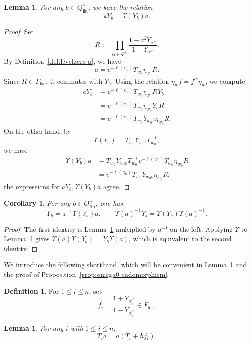 \documentclass{amsart}
\newtheorem{Lem}[Thm]{Lemma}
\newtheorem{Cor}[Thm]{Corollary}
\theoremstyle{definition}
\newtheorem{defi}[Thm]{Definition}
\numberwithin{equation}{section}
\begin{document}
\begin{Lem}\label{lem:a-y-relation}
For any $b \in Q_{\mathrm{fin}}^\vee$, we have the relation
\[
a Y_b  = \Upsilon(Y_b) a.
\]
\end{Lem}
\begin{proof}
Set
\[
R:=\prod_{\alpha\in\Phi^+}\frac{1-v^2Y_{\alpha^\vee}}{1-Y_{\alpha^\vee}}.
\]
By Definition~\ref{def:levelzero-a}, we have
\[
a=v^{-\ell(w_0)}T_{w_0}\eta_{w_0}R.
\]
Since \(R\in F_{\mathrm{loc}}\), it commutes with \(Y_b\). Using the relation \(\eta_w f=f^w\eta_w\), we compute
\begin{align*}
a Y_b
&=v^{-\ell(w_0)}T_{w_0}\eta_{w_0}RY_b\\
&=v^{-\ell(w_0)}T_{w_0}\eta_{w_0}Y_bR\\
&=v^{-\ell(w_0)}T_{w_0}Y_{w_0b}\eta_{w_0}R.
\end{align*}
On the other hand, by
\[
\Upsilon(Y_b)=T_{w_0}Y_{w_0b}T_{w_0}^{-1},
\]
we have
\begin{align*}
\Upsilon(Y_b)a
&=T_{w_0}Y_{w_0b}T_{w_0}^{-1}
  v^{-\ell(w_0)}T_{w_0}\eta_{w_0}R\\
&=v^{-\ell(w_0)}T_{w_0}Y_{w_0b}\eta_{w_0}R;
\end{align*}
the expressions for $aY_b, \Upsilon(Y_b)a$ agree.
\end{proof}

\begin{Cor}\label{cor:a-y-inverse-relations}
For any \(b\in Q_{\mathrm{fin}}^\vee\), one has
\[
Y_b=a^{-1}\Upsilon(Y_b)a,
\qquad
\Upsilon(a)^{-1}Y_b=\Upsilon(Y_b)\Upsilon(a)^{-1}.
\]
\end{Cor}
\begin{proof}
The first identity is Lemma~\ref{lem:a-y-relation} multiplied by \(a^{-1}\)
on the left. Applying \(\Upsilon\) to Lemma~\ref{lem:a-y-relation} gives
\(\Upsilon(a)\Upsilon(Y_b)=Y_b\Upsilon(a)\), which is equivalent to the
second identity.
\end{proof}

We introduce the following shorthand, which will be convenient in
Lemma~\ref{lem:t-a-relation} and the proof of
Proposition~\ref{prop:omega0-endomorphism}.
\begin{defi}
For $1\leqslant i\leqslant n$, set
\[
f_i=\frac{1+Y_{\alpha_i^\vee}}{1-Y_{\alpha_i^\vee}}\in F_{\mathrm{loc}}.
\]
\end{defi}

\begin{Lem}\label{lem:t-a-relation}
For any $i$ with $1 \leqslant i \leqslant n$,
\begin{equation}
    T_i a = a \left( T_i + \hbar f_i \right).
\end{equation}
\end{Lem}
\end{document}
